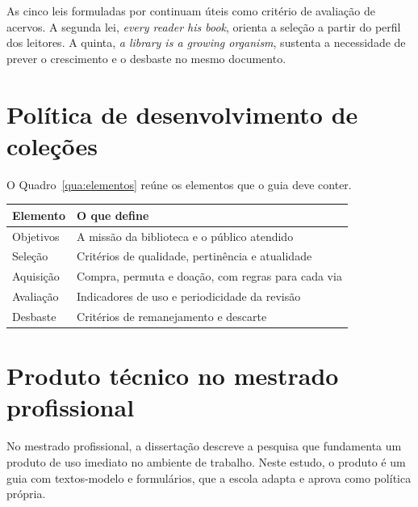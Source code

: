 As cinco leis formuladas por  continuam úteis como critério de avaliação de acervos. A segunda lei, \textit{every reader his book}, orienta a seleção a partir do perfil dos leitores. A quinta, \textit{a library is a growing organism}, sustenta a necessidade de prever o crescimento e o desbaste no mesmo documento.

\section{Política de desenvolvimento de coleções}

O Quadro~\ref{qua:elementos} reúne os elementos que o guia deve conter.

\begin{quadro}[htb]
  \caption{Elementos mínimos de uma política de desenvolvimento de coleções}
  \label{qua:elementos}
  \small
  \begin{tabularx}{\textwidth}{lX}
    \toprule
    \textbf{Elemento} & \textbf{O que define} \\
    \midrule
    Objetivos & A missão da biblioteca e o público atendido \\
    Seleção & Critérios de qualidade, pertinência e atualidade \\
    Aquisição & Compra, permuta e doação, com regras para cada via \\
    Avaliação & Indicadores de uso e periodicidade da revisão \\
    Desbaste & Critérios de remanejamento e descarte \\
    \bottomrule
  \end{tabularx}
\end{quadro}

\section{Produto técnico no mestrado profissional}

No mestrado profissional, a dissertação descreve a pesquisa que fundamenta um produto de uso imediato no ambiente de trabalho. Neste estudo, o produto é um guia com textos-modelo e formulários, que a escola adapta e aprova como política própria.
